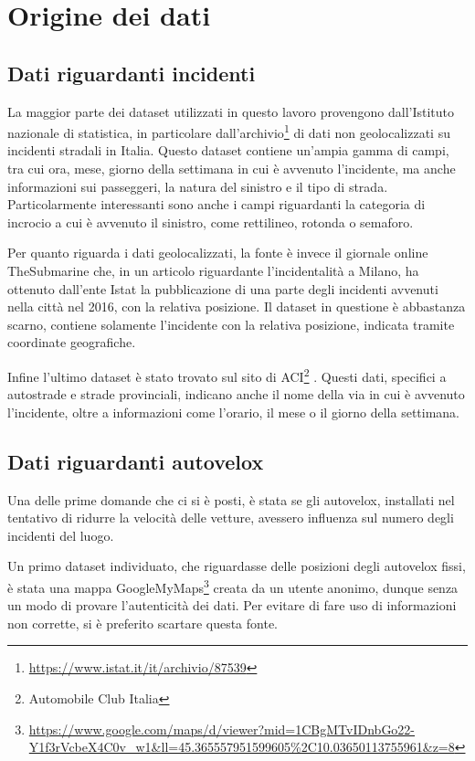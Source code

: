 \documentclass[a4paper,12pt]{report}
\begin{document}
\chapter{Origine dei dati}

\section{Dati riguardanti incidenti}

La maggior parte dei dataset utilizzati in questo lavoro provengono 
dall'Istituto nazionale di statistica, in particolare 
dall'archivio\footnote{\url{https://www.istat.it/it/archivio/87539}}
di dati non geolocalizzati su incidenti stradali in Italia.
Questo dataset contiene un'ampia gamma di campi, tra cui ora, 
mese, giorno della settimana in cui è avvenuto l'incidente, 
ma anche informazioni sui passeggeri, la natura del sinistro e il tipo di strada. 
Particolarmente interessanti sono anche i campi riguardanti la categoria di incrocio 
a cui è avvenuto il sinistro, come rettilineo, rotonda o semaforo.

Per quanto riguarda i dati geolocalizzati, 
la fonte è invece il giornale online TheSubmarine \cite{SUBMARINE:1}
che, in un articolo riguardante l'incidentalità a Milano, 
ha ottenuto dall'ente Istat la pubblicazione di una parte degli 
incidenti avvenuti nella città nel 2016, con la relativa posizione.
Il dataset in questione è abbastanza scarno, contiene solamente 
l'incidente con la relativa posizione, indicata tramite coordinate geografiche.

Infine l'ultimo dataset è stato trovato sul sito di 
ACI\footnote{Automobile Club Italia} \cite{ACI:1}.
Questi dati, specifici a autostrade e strade provinciali, indicano anche il 
nome della via in cui è avvenuto l'incidente, oltre a informazioni come 
l'orario, il mese o il giorno della settimana.

\section{Dati riguardanti autovelox}

Una delle prime domande che ci si è posti, è stata se gli autovelox, installati 
nel tentativo di ridurre la velocità delle vetture, avessero influenza sul numero 
degli incidenti del luogo.

Un primo dataset individuato, che riguardasse delle posizioni 
degli autovelox fissi, è stata una mappa 
GoogleMyMaps\footnote{\url{https://www.google.com/maps/d/viewer?mid=1CBgMTvIDnbGo22-Y1f3rVcbeX4C0v_w1&ll=45.365557951599605\%2C10.03650113755961&z=8}} 
creata da un utente anonimo, dunque senza un modo di provare l'autenticità dei dati. 
Per evitare di fare uso di informazioni non corrette, si è preferito scartare 
questa fonte.
\end{document}
